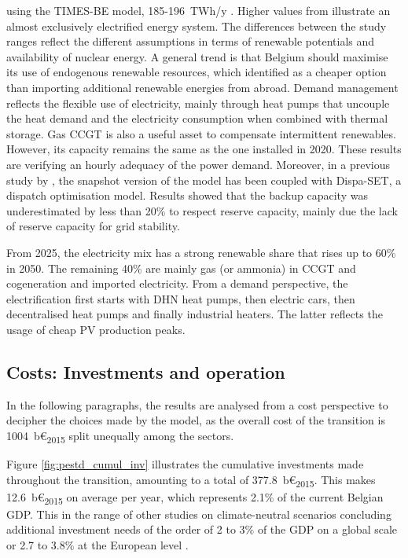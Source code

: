 using the TIMES-BE model, 185-196~TWh/y \cite{PATHS2050}. Higher values from \citet{Devogelaer2013} illustrate an almost exclusively electrified energy system. The differences between the study ranges reflect the different assumptions in terms of renewable potentials and availability of nuclear energy. A general trend is that Belgium should maximise its use of endogenous renewable resources, which \citet{dubois2023multi} identified as a cheaper option than importing additional renewable energies from abroad. Demand management reflects the flexible use of electricity, mainly through heat pumps that uncouple the heat demand and the electricity consumption when combined with thermal storage. Gas \gls{CCGT} is also a useful asset to compensate intermittent renewables. However, its capacity remains the same as the one installed in 2020. These results are verifying an hourly adequacy of the power demand. Moreover, in a previous study by \citet{pavivcevic2022bidirectionnal}, the snapshot version of the model has been coupled with Dispa-SET, a dispatch optimisation model. Results showed that the backup capacity was underestimated by less than 20\% to respect reserve capacity, mainly due the lack of reserve capacity for grid stability.  

From 2025, the electricity mix has a strong renewable share that rises up to 60\% in 2050. The remaining 40\% are mainly gas (or ammonia) in \gls{CCGT} and cogeneration and imported electricity. From a demand perspective, the electrification first starts with \gls{DHN} heat pumps, then electric cars, then decentralised heat pumps and finally industrial heaters. The latter reflects the usage of cheap \gls{PV} production peaks. 

\subsection{Costs: Investments and operation}

In the following paragraphs, the results are analysed from a cost perspective to decipher the choices made by the model, as the overall cost of the transition is 1004~b€\textsubscript{2015} split unequally among the sectors. 

Figure \ref{fig:pestd_cumul_inv} illustrates the cumulative investments made throughout the transition, amounting to a total of 377.8~b€\textsubscript{2015}. This makes 12.6~b€\textsubscript{2015} on average per year, which represents 2.1\% of the current Belgian \gls{GDP}. This in the range of other studies on climate-neutral scenarios concluding additional investment needs of the order of 2 to 3\% of the \gls{GDP} on a global scale \cite{IEA2021,IRENA2021} or 2.7 to 3.8\% at the European level \cite{Widuto2023}.

